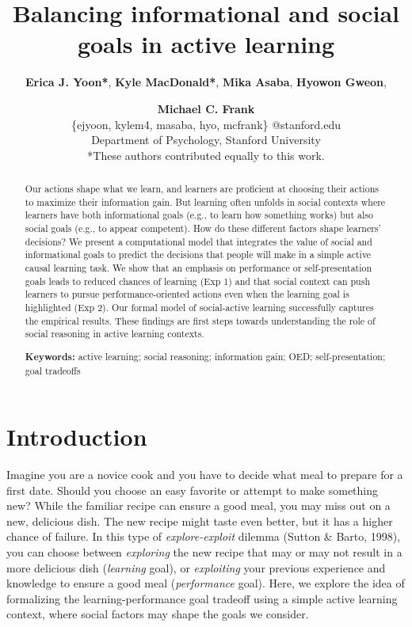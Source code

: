 \documentclass[10pt, letterpaper]{article}
\title{Balancing informational and social goals in active learning}
\author{{\large \bf Erica J. Yoon*}, {\large \bf Kyle MacDonald*}, {\large \bf Mika Asaba}, {\large \bf Hyowon Gweon}, \and {\large \bf Michael C. Frank} \\ \{ejyoon, kylem4, masaba, hyo, mcfrank\} @stanford.edu \\ Department of Psychology, Stanford University \\ *These authors contributed equally to this work.}
\begin{document}
\maketitle

\begin{abstract}
Our actions shape what we learn, and learners are proficient at choosing
their actions to maximize their information gain. But learning often
unfolds in social contexts where learners have both informational goals
(e.g., to learn how something works) but also social goals (e.g., to
appear competent). How do these different factors shape learners'
decisions? We present a computational model that integrates the value of
social and informational goals to predict the decisions that people will
make in a simple active causal learning task. We show that an emphasis
on performance or self-presentation goals leads to reduced chances of
learning (Exp 1) and that social context can push learners to pursue
performance-oriented actions even when the learning goal is highlighted
(Exp 2). Our formal model of social-active learning successfully
captures the empirical results. These findings are first steps towards
understanding the role of social reasoning in active learning contexts.

\textbf{Keywords:}
active learning; social reasoning; information gain; OED;
self-presentation; goal tradeoffs
\end{abstract}

\section{Introduction}\label{introduction}

Imagine you are a novice cook and you have to decide what meal to
prepare for a first date. Should you choose an easy favorite or attempt
to make something new? While the familiar recipe can ensure a good meal,
you may miss out on a new, delicious dish. The new recipe might taste
even better, but it has a higher chance of failure. In this type of
\emph{explore-exploit} dilemma (Sutton \& Barto, 1998), you can choose
between \emph{exploring} the new recipe that may or may not result in a
more delicious dish (\emph{learning} goal), or \emph{exploiting} your
previous experience and knowledge to ensure a good meal
(\emph{performance} goal). Here, we explore the idea of formalizing the
learning-performance goal tradeoff using a simple active learning
context, where social factors may shape the goals we consider.
\end{document}
